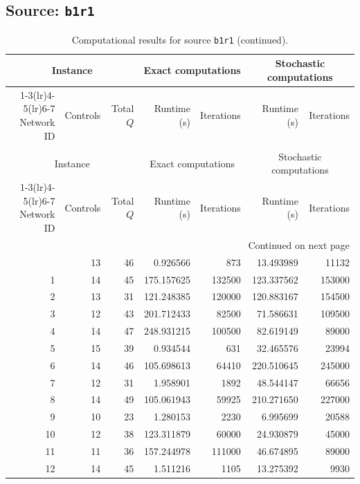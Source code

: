 \documentclass{article}
\begin{document}
\begin{landscape}
\subsection*{Source: \texttt{b1r1}}

\begin{longtable}{rrrrrrr}
\caption{Computational results for source \texttt{b1r1}.}\\
\toprule
\multicolumn{3}{c}{Instance} & \multicolumn{2}{c}{Exact computations} & \multicolumn{2}{c}{Stochastic computations} \\
\cmidrule(lr){1-3}\cmidrule(lr){4-5}\cmidrule(lr){6-7}
Network ID & Controls & Total $Q$ & Runtime (s) & Iterations & Runtime (s) & Iterations \\
\midrule
\endfirsthead
\caption[]{Computational results for source \texttt{b1r1} (continued).}\\
\toprule
\multicolumn{3}{c}{Instance} & \multicolumn{2}{c}{Exact computations} & \multicolumn{2}{c}{Stochastic computations} \\
\cmidrule(lr){1-3}\cmidrule(lr){4-5}\cmidrule(lr){6-7}
Network ID & Controls & Total $Q$ & Runtime (s) & Iterations & Runtime (s) & Iterations \\
\midrule
\endhead
\midrule
\multicolumn{7}{r}{Continued on next page} \\
\endfoot
\bottomrule
\endlastfoot
0 & 13 & 46 & 0.926566 & 873 & 13.493989 & 11132 \\
1 & 14 & 45 & 175.157625 & 132500 & 123.337562 & 153000 \\
2 & 13 & 31 & 121.248385 & 120000 & 120.883167 & 154500 \\
3 & 12 & 43 & 201.712433 & 82500 & 71.586631 & 109500 \\
4 & 14 & 47 & 248.931215 & 100500 & 82.619149 & 89000 \\
5 & 15 & 39 & 0.934544 & 631 & 32.465576 & 23994 \\
6 & 14 & 46 & 105.698613 & 64410 & 220.510645 & 245000 \\
7 & 12 & 31 & 1.958901 & 1892 & 48.544147 & 66656 \\
8 & 14 & 49 & 105.061943 & 59925 & 210.271650 & 227000 \\
9 & 10 & 23 & 1.280153 & 2230 & 6.995699 & 20588 \\
10 & 12 & 38 & 123.311879 & 60000 & 24.930879 & 45000 \\
11 & 11 & 36 & 157.244978 & 111000 & 46.674895 & 89000 \\
12 & 14 & 45 & 1.511216 & 1105 & 13.275392 & 9930 \\

\end{longtable}
\end{landscape}
\end{document}

